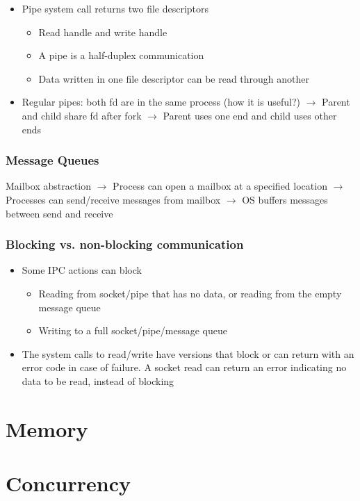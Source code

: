 \documentclass{article}
\begin{document}
\begin{itemize}
    \item Pipe system call returns two file descriptors
    \begin{itemize}
        \item Read handle and write handle
        \item A pipe is a half-duplex communication
        \item Data written in one file descriptor can be read through another
    \end{itemize}
    \item Regular pipes: both fd are in the same process (how it is useful?) $\rightarrow$ Parent and child share fd after fork $\rightarrow$ Parent uses one end and child uses other ends
\end{itemize}

\subsubsection{Message Queues}
Mailbox abstraction $\rightarrow$ Process can open a mailbox at a specified location $\rightarrow$ Processes can send/receive messages from mailbox $\rightarrow$ OS buffers messages between send and
receive

\subsubsection{Blocking vs. non-blocking communication}
\begin{itemize}
    \item Some IPC actions can block
    \begin{itemize}
        \item Reading from socket/pipe that has no data, or reading from the empty message queue
        \item Writing to a full socket/pipe/message queue
    \end{itemize}
    \item The system calls to read/write have versions that block or can return with an error code in case of failure. A socket read can return an error indicating no data to be read, instead of blocking
\end{itemize}


\section{Memory} %
\label{sec:memory}

\section{Concurrency} %
\label{sec:con}
\end{document}
